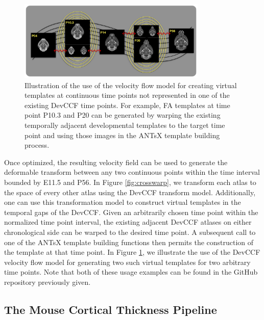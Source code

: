 \documentclass[
  12pt,
]{article}
\begin{document}
\begin{figure}[!htb]
\centering
\includegraphics[width=0.8\textwidth]{Figures/pseudo_template.pdf}
\caption{Illustration of the use of the velocity flow model for creating virtual templates
at continuous time points not represented in one of the existing DevCCF time points.
For example, FA templates at time point P10.3 and P20 can be generated by warping the 
existing temporally adjacent developmental templates to the target time point and using 
those images in the ANTsX template building process.}
\label{fig:virtual}
\end{figure}

Once optimized, the resulting velocity field can be used to generate the
deformable transform between any two continuous points within the time
interval bounded by E11.5 and P56. In Figure \ref{fig:crosswarp}, we
transform each atlas to the space of every other atlas using the DevCCF
transform model. Additionally, one can use this transformation model to
construct virtual templates in the temporal gaps of the DevCCF. Given an
arbitrarily chosen time point within the normalized time point interval,
the existing adjacent DevCCF atlases on either chronological side can be
warped to the desired time point. A subsequent call to one of the ANTsX
template building functions then permits the construction of the
template at that time point. In Figure \ref{fig:virtual}, we illustrate
the use of the DevCCF velocity flow model for generating two such
virtual templates for two arbitrary time points. Note that both of these
usage examples can be found in the GitHub repository previously given.

\hypertarget{the-mouse-cortical-thickness-pipeline}{%
\subsection{The Mouse Cortical Thickness
Pipeline}\label{the-mouse-cortical-thickness-pipeline}}
\end{document}
